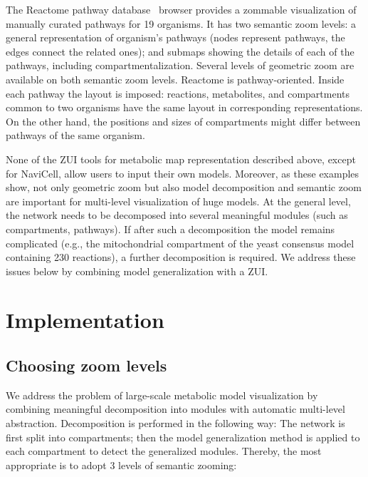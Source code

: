 \documentclass{bmcart}
\begin{document}
The Reactome pathway database~\cite{Milacic2012, Croft2013} browser provides a zommable visualization of manually curated pathways for 19 organisms. It has two semantic zoom levels: a general representation of organism's pathways (nodes represent pathways, the edges connect the related ones); and submaps showing the details of each of the pathways, including compartmentalization. Several levels of geometric zoom are available on both semantic zoom levels. Reactome is pathway-oriented. Inside each pathway the layout is imposed: reactions, metabolites, and compartments common to two organisms have the same layout in corresponding representations. On the other hand, the positions and sizes of compartments might differ between pathways of the same organism.

None of the ZUI tools for metabolic map representation described above, except for NaviCell, allow users to input their own models. Moreover, as these examples show, not only geometric zoom but also model decomposition and semantic zoom are important for multi-level visualization of huge models. At the general level, the network needs to be decomposed into several meaningful modules (such as compartments, pathways). If after such a decomposition the model remains complicated (e.g., the mitochondrial compartment of the yeast consensus model~\cite{Herrgard2008} containing 230 reactions), a further decomposition is required. We address these issues below by combining model generalization with a ZUI.


\section*{Implementation}

\subsection*{Choosing zoom levels}
We address the problem of large-scale metabolic model visualization by combining meaningful decomposition into modules with automatic multi-level abstraction. Decomposition is performed in the following way: The network is first split into compartments; then the model generalization method is applied to each compartment to detect the generalized modules. Thereby, the most appropriate is to adopt 3 levels of semantic zooming:
\end{document}
